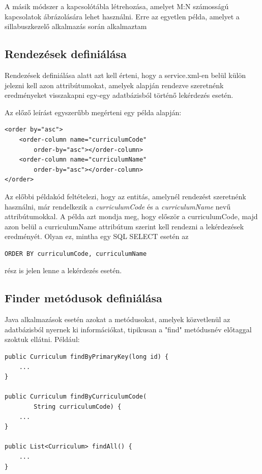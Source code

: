 \documentclass[hidelinks, 12pt, a4paper]{report}
\begin{document}
A másik módszer a kapcsolótábla létrehozása, amelyet M:N számosságú kapcsolatok ábrázolására lehet használni. Erre az egyetlen példa, amelyet a sillabuszkezelő alkalmazás során alkalmaztam

\subsection{Rendezések definiálása}

Rendezések definiálása alatt azt kell érteni, hogy a service.xml-en belül külön jelezni kell azon attribútumokat, amelyek alapján rendezve szeretnénk eredményeket visszakapni egy-egy adatbázisból történő lekérdezés esetén.

Az előző leírást egyszerűbb megérteni egy példa alapján:

\begin{minipage}{\linewidth}
\begin{lstlisting}
<order by="asc">
	<order-column name="curriculumCode"
		order-by="asc"></order-column>
	<order-column name="curriculumName"
		order-by="asc"></order-column>
</order>
\end{lstlisting}
\end{minipage}

Az előbbi példakód feltételezi, hogy az entitás, amelynél rendezést szeretnénk használni, már rendelkezik a \emph{curriculumCode} és a \emph{curriculumName} nevű attribútumokkal. A példa azt mondja meg, hogy először a curriculumCode, majd azon belül a curriculumName attribútum szerint kell rendezni a lekérdezések eredményét. Olyan ez, mintha egy SQL SELECT esetén az
\begin{lstlisting}
ORDER BY curriculumCode, curriculumName
\end{lstlisting}
rész is jelen lenne a lekérdezés esetén.

\subsection{Finder metódusok definiálása}

Java alkalmazások esetén azokat a metódusokat, amelyek közvetlenül az adatbázisból nyernek ki információkat, tipikusan a "find" metódusnév előtaggal szoktuk ellátni. Például:

\begin{minipage}{\linewidth}
\begin{lstlisting}
public Curriculum findByPrimaryKey(long id) {
	...
}

public Curriculum findByCurriculumCode(
		String curriculumCode) {
	...
}

public List<Curriculum> findAll() {
	...
}
\end{lstlisting}
\end{minipage}
\end{document}
